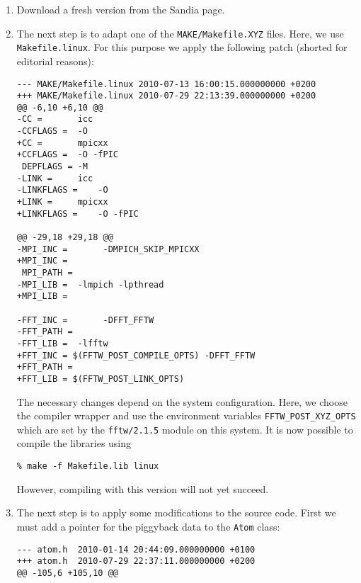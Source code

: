 \begin{enumerate}
\item Download a fresh \LAMMPS version from the Sandia page.

\item The next step is to adapt one of the \lstinline[style=SHELL]|MAKE/Makefile.XYZ| files. Here, we use \lstinline[style= SHELL]|Makefile.linux|. For this purpose we apply the following patch (shorted for editorial reasons):

\vspace{1pt}
\begin{lstlisting}[style=SHELL_SMALL,frame=lines]
--- MAKE/Makefile.linux	2010-07-13 16:00:15.000000000 +0200
+++ MAKE/Makefile.linux	2010-07-29 22:13:39.000000000 +0200
@@ -6,10 +6,10 @@
-CC =		icc
-CCFLAGS =	-O
+CC =		mpicxx
+CCFLAGS =	-O -fPIC
 DEPFLAGS =	-M
-LINK =		icc
-LINKFLAGS =	-O
+LINK =		mpicxx
+LINKFLAGS =	-O -fPIC

@@ -29,18 +29,18 @@
-MPI_INC =       -DMPICH_SKIP_MPICXX 
+MPI_INC = 
 MPI_PATH = 
-MPI_LIB =	-lmpich -lpthread
+MPI_LIB =
 
-FFT_INC =       -DFFT_FFTW
-FFT_PATH = 
-FFT_LIB =	-lfftw
+FFT_INC = $(FFTW_POST_COMPILE_OPTS) -DFFT_FFTW
+FFT_PATH =
+FFT_LIB = $(FFTW_POST_LINK_OPTS)
\end{lstlisting}

The necessary changes depend on the system configuration. Here, we choose the \MPI compiler wrapper and use the environment variables \lstinline[style=SHELL]|FFTW_POST_XYZ_OPTS| which are set by the \lstinline[style=SHELL]|fftw/2.1.5| module on this system. It is now possible to compile the \LAMMPS libraries using

\begin{lstlisting}[style=SHELL]
% make makelib
% make -f Makefile.lib linux
\end{lstlisting}

However, compiling \MACI with this \LAMMPS version will not yet succeed.

\item The next step is to apply some modifications to the \LAMMPS source code. First we must add a pointer for the piggyback data to the \lstinline[style=CODE]|Atom| class:

\vspace{1pt}
\begin{lstlisting}[style=CODE_SMALL,frame=lines]
--- atom.h	2010-01-14 20:44:09.000000000 +0100
+++ atom.h	2010-07-29 22:37:11.000000000 +0200
@@ -105,6 +105,10 @@
 

\end{lstlisting}
\end{enumerate}
